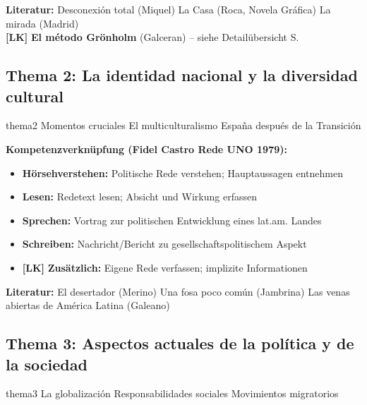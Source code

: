 \documentclass[11pt,a4paper]{article}
\newcommand{\lmark}{\textcolor{accentorange}{\textbf{[LK]}}}
\begin{document}
\begin{literaturbox}
\textbf{Literatur:} Desconexión total (Miquel) \textbullet{} La Casa (Roca, Novela Gráfica) \textbullet{} La mirada (Madrid)\\
\lmark{} \textbf{El método Grönholm} (Galceran) -- siehe Detailübersicht S. \pageref{sec:gronholm}
\end{literaturbox}

\subsection{Thema 2: La identidad nacional y la diversidad cultural}

\begin{themenbox}[Schwerpunkte]{thema2}
Momentos cruciales \textbullet{} El multiculturalismo \textbullet{} España después de la Transición
\end{themenbox}

\textbf{Kompetenzverknüpfung (Fidel Castro Rede UNO 1979):}
\begin{itemize}[leftmargin=1cm, itemsep=1pt]
\item \textbf{Hörsehverstehen:} Politische Rede verstehen; Hauptaussagen entnehmen
\item \textbf{Lesen:} Redetext lesen; Absicht und Wirkung erfassen
\item \textbf{Sprechen:} Vortrag zur politischen Entwicklung eines lat.am. Landes
\item \textbf{Schreiben:} Nachricht/Bericht zu gesellschaftspolitischem Aspekt
\item \lmark{} \textbf{Zusätzlich:} Eigene Rede verfassen; implizite Informationen
\end{itemize}

\begin{literaturbox}
\textbf{Literatur:} El desertador (Merino) \textbullet{} Una fosa poco común (Jambrina) \textbullet{} Las venas abiertas de América Latina (Galeano)
\end{literaturbox}

\subsection{Thema 3: Aspectos actuales de la política y de la sociedad}

\begin{themenbox}[Schwerpunkte]{thema3}
La globalización \textbullet{} Responsabilidades sociales \textbullet{} Movimientos migratorios
\end{themenbox}
\end{document}
